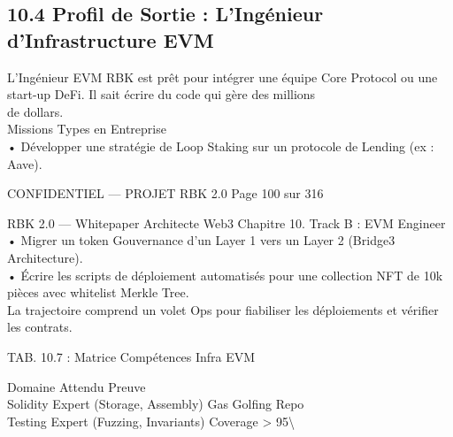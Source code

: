 \documentclass[12pt,landscape,a4paper]{article}
\newenvironment{confidential}
{\begin{tcolorbox}[
    colback=rbkred!5!white,
    colframe=rbkred!75!black,
    title=CONFIDENTIEL,
    fonttitle=\bfseries\color{white},
    coltitle=rbkred!75!black,
    breakable,
    enhanced,
    frame hidden,
    borderline west={2pt}{0pt}{rbkred!75!black}
]}
{\end{tcolorbox}}
\begin{document}
\subsection{10.4 Profil de Sortie : L’Ingénieur d’Infrastructure EVM}
L’Ingénieur EVM RBK est prêt pour intégrer une équipe Core Protocol ou une start-up DeFi. Il sait écrire du code qui gère des millions\\
de dollars.\\
\vspace{0.5em}
Missions Types en Entreprise\\
\vspace{0.5em}
• Développer une stratégie de Loop Staking sur un protocole de Lending (ex : Aave).\\
\vspace{0.5em}
\vspace{0.5em}
\begin{confidential}CONFIDENTIEL — PROJET RBK 2.0                                Page 100 sur 316\end{confidential}
RBK 2.0 — Whitepaper Architecte Web3                                                                                       Chapitre 10. Track B : EVM Engineer\\
\vspace{0.5em}
\vspace{0.5em}
• Migrer un token Gouvernance d’un Layer 1 vers un Layer 2 (Bridge3 Architecture).\\
\vspace{0.5em}
• Écrire les scripts de déploiement automatisés pour une collection NFT de 10k pièces avec whitelist Merkle Tree.\\
\vspace{0.5em}
La trajectoire comprend un volet Ops pour fiabiliser les déploiements et vérifier les contrats.\\
\vspace{0.5em}
\begin{center}\begin{tabular}TAB. 10.7 : Matrice Compétences Infra EVM\end{tabular}\end{center}
\vspace{0.5em}
\vspace{0.5em}
Domaine Attendu                       Preuve\\
Solidity Expert (Storage, Assembly) Gas Golfing Repo\\
Testing  Expert (Fuzzing, Invariants) Coverage \textgreater{} 95\textbackslash{}%
\end{document}
